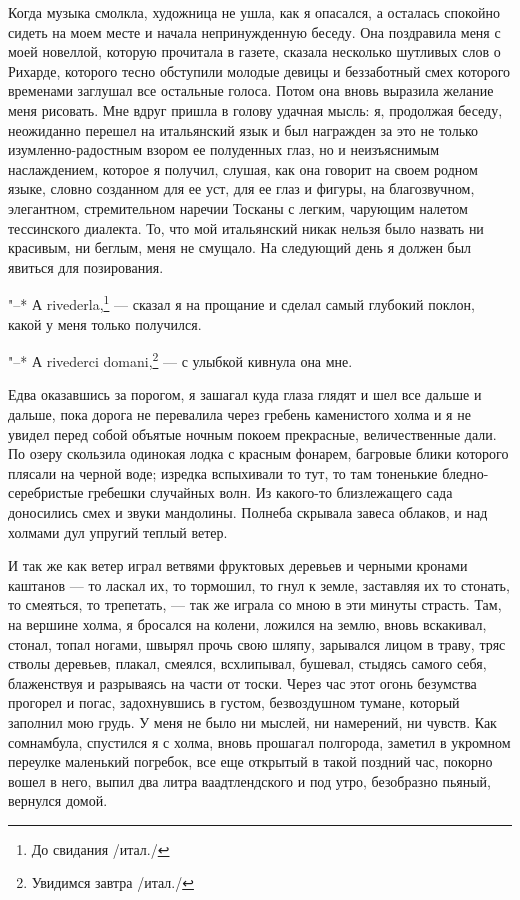 Когда музыка  смолкла, художница не  ушла, как я опасался,  а осталась
спокойно  сидеть на  моем месте  и начала  непринужденную беседу.  Она
поздравила меня с  моей новеллой, которую прочитала  в газете, сказала
несколько шутливых  слов о  Рихарде, которого тесно  обступили молодые
девицы и  беззаботный смех  которого временами заглушал  все остальные
голоса.  Потом она  вновь выразила  желание меня  рисовать. Мне  вдруг
пришла  в  голову  удачная  мысль:  я,  продолжая  беседу,  неожиданно
перешел  на  итальянский  язык  и  был  награжден  за  это  не  только
изумленно-радостным  взором  ее  полуденных глаз,  но  и  неизъяснимым
наслаждением,  которое я  получил, слушая,  как она  говорит на  своем
родном языке,  словно созданном для ее  уст, для ее глаз  и фигуры, на
благозвучном,  элегантном,  стремительном  наречии Тосканы  с  легким,
чарующим налетом  тессинского диалекта. То, что  мой итальянский никак
нельзя  было назвать  ни  красивым,  ни беглым,  меня  не смущало.  На
следующий день я должен был явиться для позирования.

"--*  А  rivederla,\footnote{До  свидания  /итал./} ---  сказал  я  на
прощание  и  сделал  самый  глубокий   поклон,  какой  у  меня  только
получился.

"--*  А  rivederci  domani,\footnote{Увидимся завтра  /итал./}  ---  с
улыбкой кивнула она мне.

Едва оказавшись  за порогом,  я зашагал  куда глаза  глядят и  шел все
дальше и дальше,  пока дорога не перевалила  через гребень каменистого
холма  и я  не увидел  перед собой  объятые ночным  покоем прекрасные,
величественные  дали.  По озеру  скользила  одинокая  лодка с  красным
фонарем,  багровые  блики которого  плясали  на  черной воде;  изредка
вспыхивали  то  тут,  то  там  тоненькие  бледно-серебристые  гребешки
случайных волн. Из какого-то близлежащего сада доносились смех и звуки
мандолины. Полнеба скрывала завеса облаков,  и над холмами дул упругий
теплый ветер.

И так же как ветер играл  ветвями фруктовых деревьев и черными кронами
каштанов --- то ласкал их, то  тормошил, то гнул к земле, заставляя их
то стонать, то смеяться, то трепетать, --- так же играла со мною в эти
минуты страсть. Там,  на вершине холма, я бросался  на колени, ложился
на землю,  вновь вскакивал,  стонал, топал  ногами, швырял  прочь свою
шляпу, зарывался лицом в траву, тряс стволы деревьев, плакал, смеялся,
всхлипывал, бушевал, стыдясь самого  себя, блаженствуя и разрываясь на
части  от тоски.  Через час  этот  огонь безумства  прогорел и  погас,
задохнувшись  в  густом,  безвоздушном тумане,  который  заполнил  мою
грудь.  У  меня не  было  ни  мыслей,  ни  намерений, ни  чувств.  Как
сомнамбула, спустился я  с холма, вновь прошагал  полгорода, заметил в
укромном переулке маленький погребок, все еще открытый в такой поздний
час, покорно вошел в него, выпил  два литра ваадтлендского и под утро,
безобразно пьяный, вернулся домой.


